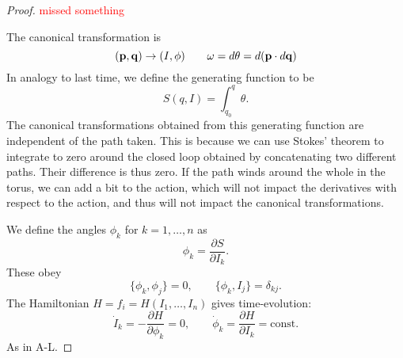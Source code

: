 \begin{proof}
  \textcolor{red}{missed something}
  
  The canonical transformation is
  \begin{equation}
    (\vb{p}, \vb{q}) \to (I, \phi)\qquad
    \omega = d \theta = d (\vb{p} \cdot d\vb{q})
  \end{equation}
  In analogy to last time, we define the generating function to be
  \begin{equation}
    S (q, I) = \int_{q_0}^{q} \theta.
  \end{equation}
  The canonical transformations obtained from this generating function are independent of the path taken.
  This is because we can use Stokes' theorem to integrate to zero around the closed loop obtained by concatenating two different paths. Their difference is thus zero.
  If the path winds around the whole in the torus, we can add a bit to the action, which will not impact the derivatives with respect to the action, and thus will not impact the canonical transformations.
  
  We define the angles $\phi_k$ for $k = 1, \dots,  n$ as
  \begin{equation}
    \phi_k = \frac{\partial S}{\partial I_k}.
  \end{equation}
  These obey
  \begin{equation}
    \{ \phi_k, \phi_j \} = 0, \qquad \{ \phi_k, I_j \} = \delta_{kj}.
  \end{equation}
  The Hamiltonian $H = f_i = H(I_1, \dots, I_n)$ gives time-evolution:
  \begin{equation}
    \dot{I}_k = - \frac{\partial H}{\partial \phi_k} = 0, \qquad \dot{\phi}_k = \frac{\partial H}{\partial I_k} = \text{const.}
  \end{equation}
  As in A-L.
\end{proof}


